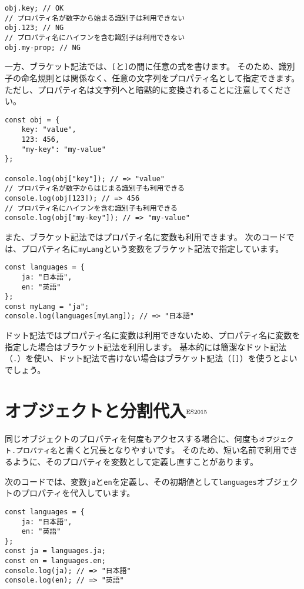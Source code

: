 \begin{lstlisting}
obj.key; // OK
// プロパティ名が数字から始まる識別子は利用できない
obj.123; // NG
// プロパティ名にハイフンを含む識別子は利用できない
obj.my-prop; // NG
\end{lstlisting}

一方、ブラケット記法では、\texttt{[}と\texttt{]}の間に任意の式を書けます。
そのため、識別子の命名規則とは関係なく、任意の文字列をプロパティ名として指定できます。
ただし、プロパティ名は文字列へと暗黙的に変換されることに注意してください。

\begin{lstlisting}
const obj = {
    key: "value",
    123: 456,
    "my-key": "my-value"
};

console.log(obj["key"]); // => "value"
// プロパティ名が数字からはじまる識別子も利用できる
console.log(obj[123]); // => 456
// プロパティ名にハイフンを含む識別子も利用できる
console.log(obj["my-key"]); // => "my-value"
\end{lstlisting}

また、ブラケット記法ではプロパティ名に変数も利用できます。
次のコードでは、プロパティ名に\texttt{myLang}という変数をブラケット記法で指定しています。

\begin{lstlisting}
const languages = {
    ja: "日本語",
    en: "英語"
};
const myLang = "ja";
console.log(languages[myLang]); // => "日本語"
\end{lstlisting}

ドット記法ではプロパティ名に変数は利用できないため、プロパティ名に変数を指定した場合はブラケット記法を利用します。
基本的には簡潔なドット記法（\texttt{.}）を使い、ドット記法で書けない場合はブラケット記法（\texttt{[]}）を使うとよいでしょう。

\hypertarget{object-destructuring}{%
\section{オブジェクトと分割代入{$^{\rm ES2015}$}}\label{object-destructuring}}

同じオブジェクトのプロパティを何度もアクセスする場合に、何度も\texttt{オブジェクト.プロパティ名}と書くと冗長となりやすいです。
そのため、短い名前で利用できるように、そのプロパティを変数として定義し直すことがあります。

次のコードでは、変数\texttt{ja}と\texttt{en}を定義し、その初期値として\texttt{languages}オブジェクトのプロパティを代入しています。

\begin{lstlisting}
const languages = {
    ja: "日本語",
    en: "英語"
};
const ja = languages.ja;
const en = languages.en;
console.log(ja); // => "日本語"
console.log(en); // => "英語"
\end{lstlisting}

